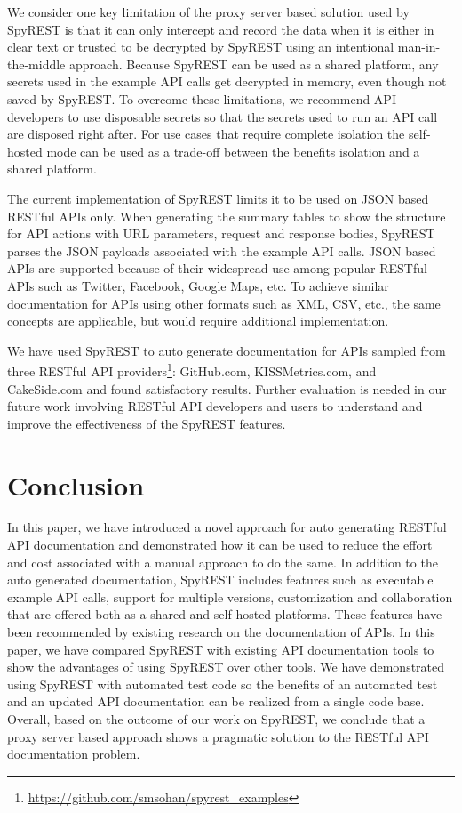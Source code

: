 \documentclass[conference]{IEEEtran}
\begin{document}
We consider one key limitation of the proxy server based solution used by SpyREST is that it can only intercept and record the data when it is either in clear text or trusted to be decrypted by SpyREST using an intentional man-in-the-middle approach. Because SpyREST can be used as a shared platform, any secrets used in the example API calls get decrypted in memory, even though not saved by SpyREST. To overcome these limitations, we recommend API developers to use disposable secrets so that the secrets used to run an API call are disposed right after. For use cases that require complete isolation the self-hosted mode can be used as a trade-off between the benefits isolation and a shared platform.

The current implementation of SpyREST limits it to be used on JSON based RESTful APIs only. When generating the summary tables to show the structure for API actions with URL parameters, request and response bodies, SpyREST parses the JSON payloads associated with the example API calls. JSON based APIs are supported because of their widespread use among popular RESTful APIs such as Twitter, Facebook, Google Maps, etc. To achieve similar documentation for APIs using other formats such as XML, CSV, etc., the same concepts are applicable, but would require additional implementation.

We have used SpyREST to auto generate documentation for APIs sampled from three RESTful API providers\footnote{\url{https://github.com/smsohan/spyrest_examples}}: GitHub.com, KISSMetrics.com, and CakeSide.com and found satisfactory results. Further evaluation is needed in our future work involving RESTful API developers and users to understand and improve the effectiveness of the SpyREST features.

\section{Conclusion}
In this paper, we have introduced a novel approach for auto generating RESTful API documentation and demonstrated how it can be used to reduce the effort and cost associated with a manual approach to do the same. In addition to the auto generated documentation, SpyREST includes features such as executable example API calls, support for multiple versions, customization and collaboration that are offered both as a shared and self-hosted platforms. These features have been recommended by existing research on the documentation of APIs. In this paper, we have compared SpyREST with existing API documentation tools to show the advantages of using SpyREST over other tools. We have demonstrated using SpyREST with automated test code so the benefits of an automated test and an updated API documentation can be realized from a single code base. Overall, based on the outcome of our work on SpyREST, we conclude that a proxy server based approach shows a pragmatic solution to the RESTful API documentation problem.
\end{document}
